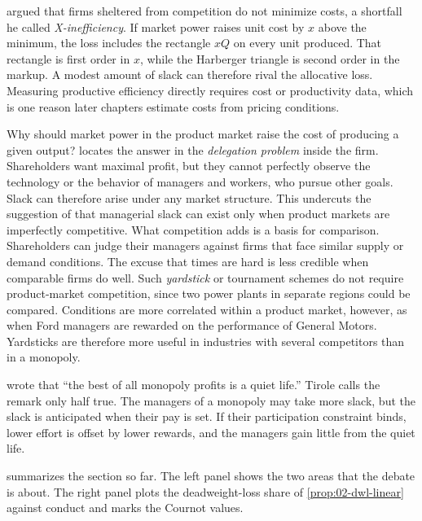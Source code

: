 \citet{Leibenstein1966} argued that firms sheltered from competition do not minimize costs, a shortfall he called
\emph{X-inefficiency}. If market power raises unit cost by $x$ above the minimum, the loss includes the rectangle
$xQ$ on every unit produced. That rectangle is first order in $x$, while the Harberger triangle is second order in
the markup. A modest amount of slack can therefore rival the allocative loss. Measuring productive efficiency
directly requires cost or productivity data, which is one reason later chapters estimate costs from pricing
conditions.

Why should market power in the product market raise the cost of producing a given output?
\citet[sec.~1.2]{Tirole1988} locates the answer in the \emph{delegation problem} inside the firm. Shareholders want
maximal profit, but they cannot perfectly observe the technology or the behavior of managers and workers, who pursue
other goals. Slack can therefore arise under any market structure. This undercuts the suggestion of
\citet{Machlup1967} that managerial slack can exist only when product markets are imperfectly competitive. What
competition adds is a basis for comparison. Shareholders can judge their managers against firms that face similar
supply or demand conditions. The excuse that times are hard is less credible when comparable firms do well. Such
\emph{yardstick} or tournament schemes do not require product-market competition, since two power plants in
separate regions could be compared. Conditions are more correlated within a product market, however, as when Ford
managers are rewarded on the performance of General Motors. Yardsticks are therefore more useful in industries with
several competitors than in a monopoly.

\citet{Hicks1935} wrote that ``the best of all monopoly profits is a quiet life.'' Tirole calls the remark only half
true. The managers of a monopoly may take more slack, but the slack is anticipated when their pay is set. If their
participation constraint binds, lower effort is offset by lower rewards, and the managers gain little from the
quiet life.

 summarizes the section so far. The left panel shows the two areas that the debate is about. The
right panel plots the deadweight-loss share of \cref{prop:02-dwl-linear} against conduct and marks the Cournot
values.

